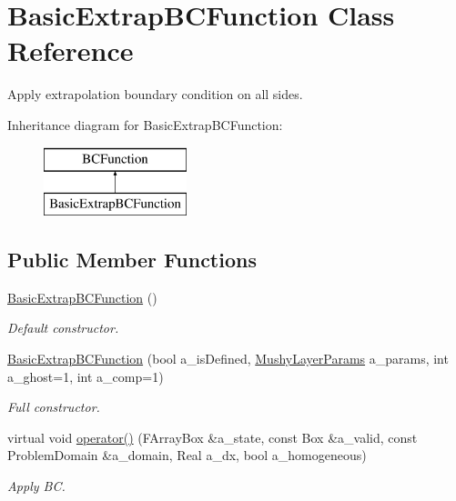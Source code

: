 \hypertarget{class_basic_extrap_b_c_function}{\section{Basic\-Extrap\-B\-C\-Function Class Reference}
\label{class_basic_extrap_b_c_function}
}


Apply extrapolation boundary condition on all sides.  


Inheritance diagram for Basic\-Extrap\-B\-C\-Function\-:\begin{figure}[H]
\begin{center}
\leavevmode
\includegraphics[height=2.000000cm]{class_basic_extrap_b_c_function}
\end{center}
\end{figure}
\subsection*{Public Member Functions}
\begin{DoxyCompactItemize}
\item 
\hypertarget{class_basic_extrap_b_c_function_a989fb8339fdf36db5afbce00a5ae98bc}{\hyperlink{class_basic_extrap_b_c_function_a989fb8339fdf36db5afbce00a5ae98bc}{Basic\-Extrap\-B\-C\-Function} ()}\label{class_basic_extrap_b_c_function_a989fb8339fdf36db5afbce00a5ae98bc}

\begin{DoxyCompactList}\small\item\em Default constructor. \end{DoxyCompactList}\item 
\hypertarget{class_basic_extrap_b_c_function_a96b6cfd3661ba2ccfa52c40683ccfe0a}{\hyperlink{class_basic_extrap_b_c_function_a96b6cfd3661ba2ccfa52c40683ccfe0a}{Basic\-Extrap\-B\-C\-Function} (bool a\-\_\-is\-Defined, \hyperlink{class_mushy_layer_params}{Mushy\-Layer\-Params} a\-\_\-params, int a\-\_\-ghost=1, int a\-\_\-comp=1)}\label{class_basic_extrap_b_c_function_a96b6cfd3661ba2ccfa52c40683ccfe0a}

\begin{DoxyCompactList}\small\item\em Full constructor. \end{DoxyCompactList}\item 
\hypertarget{class_basic_extrap_b_c_function_a68c6e7666355e178e8005b6e63473d19}{virtual void \hyperlink{class_basic_extrap_b_c_function_a68c6e7666355e178e8005b6e63473d19}{operator()} (F\-Array\-Box \&a\-\_\-state, const Box \&a\-\_\-valid, const Problem\-Domain \&a\-\_\-domain, Real a\-\_\-dx, bool a\-\_\-homogeneous)}\label{class_basic_extrap_b_c_function_a68c6e7666355e178e8005b6e63473d19}

\begin{DoxyCompactList}\small\item\em Apply B\-C. \end{DoxyCompactList}\end{DoxyCompactItemize}
